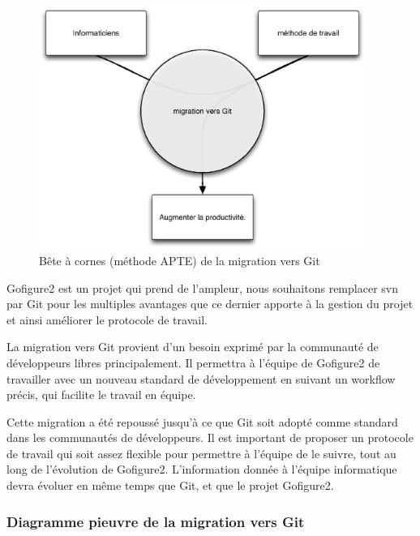 \begin{figure}[H]
\begin{center}
\leavevmode
\includegraphics[width=0.95\textwidth]{pictures/GitBAC}
\end{center}
\caption{Bête à cornes (méthode {APTE\textregistered}) de la migration vers Git}
\label{fig:BACGit}
\end{figure}

Gofigure2 est un projet qui prend de l'ampleur,
nous souhaitons remplacer svn par Git pour les multiples avantages
que ce dernier apporte à la gestion du projet et ainsi améliorer le protocole de travail.

La migration vers Git provient d'un besoin exprimé par la communauté de développeurs libres principalement.
Il permettra à l'équipe de Gofigure2 de travailler 
avec un nouveau standard de développement en suivant un workflow précis, qui facilite le travail en équipe.

Cette migration a été repoussé jusqu'à ce que Git soit adopté comme standard dans les communautés de développeurs.
Il est important de proposer un protocole de travail qui soit assez flexible pour permettre à l'équipe de le suivre,
tout au long de l'évolution de Gofigure2.
L'information donnée à l'équipe informatique devra évoluer en même temps que Git, et que le projet Gofigure2.


\subsubsection*{Diagramme pieuvre de la migration vers Git}

